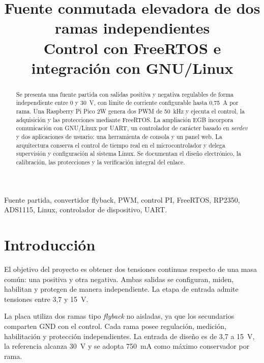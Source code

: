 \documentclass[conference]{IEEEtran}
\begin{document}
\title{Fuente conmutada elevadora de dos ramas independientes\\
\large Control con FreeRTOS e integración con GNU/Linux}

\author{
}

\maketitle

\begin{abstract}
Se presenta una fuente partida con salidas positiva y negativa regulables de forma independiente entre 0 y 30~V, con límite de corriente configurable hasta 0,75~A por rama. Una Raspberry Pi Pico 2W genera dos PWM de 50~kHz y ejecuta el control, la adquisición y las protecciones mediante FreeRTOS. La ampliación EGB incorpora comunicación con GNU/Linux por UART, un controlador de carácter basado en \textit{serdev} y dos aplicaciones de usuario: una herramienta de consola y un panel web. La arquitectura conserva el control de tiempo real en el microcontrolador y delega supervisión y configuración al sistema Linux. Se documentan el diseño electrónico, la calibración, las protecciones y la verificación integral del enlace.
\end{abstract}

\begin{IEEEkeywords}
Fuente partida, convertidor flyback, PWM, control PI, FreeRTOS, RP2350, ADS1115, Linux, controlador de dispositivo, UART.
\end{IEEEkeywords}

\newpage
{\small\setcounter{tocdepth}{1}\tableofcontents}
\clearpage

\section{Introducción}

El objetivo del proyecto es obtener dos tensiones continuas respecto de una masa común: una positiva y otra negativa. Ambas salidas se configuran, miden, habilitan y protegen de manera independiente. La etapa de entrada admite tensiones entre 3,7 y 15~V.

La placa utiliza dos ramas tipo \textit{flyback} no aisladas, ya que los secundarios comparten GND con el control. Cada rama posee regulación, medición, habilitación y protección independientes. La entrada de diseño es de 3,7 a 15~V, la referencia alcanza 30~V y se adopta 750~mA como máximo conservador por rama.
\end{document}
